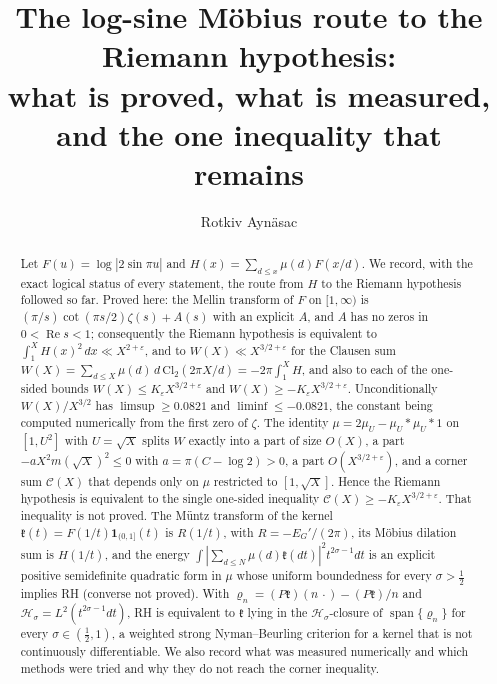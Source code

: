 \documentclass[11pt,reqno]{amsart}
\numberwithin{equation}{section}
\theoremstyle{plain}
\theoremstyle{definition}
\theoremstyle{remark}
\begin{document}
\title[The log-sine M\"obius route]{The log-sine M\"obius route to the Riemann hypothesis:\\ what is proved, what is measured, and the one inequality that remains}
\author{Rotkiv Ayn\"asac}
\date{}

\begin{abstract}
Let $F(u)=\log|2\sin\pi u|$ and $H(x)=\sum_{d\le x}\mu(d)F(x/d)$. We record, with the exact logical status of every statement, the route from $H$ to the Riemann hypothesis followed so far. Proved here: the Mellin transform of $F$ on $[1,\infty)$ is $(\pi/s)\cot(\pi s/2)\zeta(s)+A(s)$ with an explicit $A$, and $A$ has no zeros in $0<\operatorname{Re}s<1$; consequently the Riemann hypothesis is equivalent to $\int_1^XH(x)^2\,dx\ll X^{2+\varepsilon}$, and to $W(X)\ll X^{3/2+\varepsilon}$ for the Clausen sum $W(X)=\sum_{d\le X}\mu(d)\,d\,\mathrm{Cl}_2(2\pi X/d)=-2\pi\int_1^XH$, and also to each of the one-sided bounds $W(X)\le K_\varepsilon X^{3/2+\varepsilon}$ and $W(X)\ge-K_\varepsilon X^{3/2+\varepsilon}$. Unconditionally $W(X)/X^{3/2}$ has $\limsup\ge0.0821$ and $\liminf\le-0.0821$, the constant being computed numerically from the first zero of $\zeta$. The identity $\mu=2\mu_U-\mu_U*\mu_U*1$ on $[1,U^2]$ with $U=\sqrt X$ splits $W$ exactly into a part of size $O(X)$, a part $-aX^2m(\sqrt X)^2\le0$ with $a=\pi(C-\log2)>0$, a part $O(X^{3/2+\varepsilon})$, and a corner sum $\mathcal C(X)$ that depends only on $\mu$ restricted to $[1,\sqrt X]$. Hence the Riemann hypothesis is equivalent to the single one-sided inequality $\mathcal C(X)\ge-K_\varepsilon X^{3/2+\varepsilon}$. That inequality is not proved. The M\"untz transform of the kernel $\mathfrak k(t)=F(1/t)\mathbf 1_{(0,1]}(t)$ is $R(1/t)$, with $R=-E_G'/(2\pi)$, its M\"obius dilation sum is $H(1/t)$, and the energy $\int|\sum_{d\le N}\mu(d)\mathfrak k(dt)|^2t^{2\sigma-1}dt$ is an explicit positive semidefinite quadratic form in $\mu$ whose uniform boundedness for every $\sigma>\frac12$ implies RH (converse not proved). With $\varrho_n=(P\mathfrak k)(n\,\cdot)-(P\mathfrak k)/n$ and $\mathcal H_\sigma=L^2(t^{2\sigma-1}dt)$, RH is equivalent to $\mathfrak k$ lying in the $\mathcal H_\sigma$-closure of $\operatorname{span}\{\varrho_n\}$ for every $\sigma\in(\frac12,1)$, a weighted strong Nyman--Beurling criterion for a kernel that is not continuously differentiable. We also record what was measured numerically and which methods were tried and why they do not reach the corner inequality.
\end{abstract}
\end{document}
